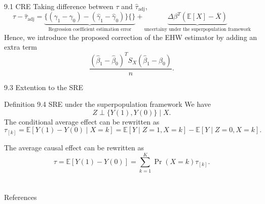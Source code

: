 \documentclass[aspectratio=169, 12pt]{beamer}
\begin{document}
\begin{frame}{9.1 CRE}
  Taking difference between $\tau$ and $\hat{\tau}_{\text{adj}}$,
  \[
  \tau - \hat{\tau}_{\text{adj}} = \underbrace{\{(\gamma_1-\gamma_0)-(\hat{\gamma}_1-\hat{\gamma}_0)\}\{\}}_{\text{Regression coefficient estimation error}} + \underbrace{\Delta \beta^T(\mathbb{E}[X]-\overline{X})}_{\text{uncertainy under the superpopulation framework}}
  \]
  Hence, we introduce the proposed correction of the EHW estimator by adding an extra term
  \[
  \frac{(\hat{\beta}_1-\hat{\beta}_0)^T S_X(\hat{\beta}_1-\hat{\beta}_0)}{n}.
  \]
\end{frame}

\begin{frame}{9.3 Extention to the SRE}
  \begin{keybox}{Definition 9.4 SRE under the superpopulation framework}
    We have
    \[
    Z\perp \{Y(1),Y(0)\}\mid X.
    \]
    The conditional average effect can be rewritten as
    \[
    \tau_{[k]}=\mathbb{E}[Y(1)-Y(0)\mid X=k] = \mathbb{E}[Y\mid Z=1, X=k]-\mathbb{E}[Y\mid Z=0, X=k].
    \]
  \end{keybox}
  The average causal effect can be rewritten as
  \[
  \tau = \mathbb{E}[Y(1)-Y(0)] = \sum_{k=1}^{K}\Pr (X=k)\tau_{[k]}.
  \]
\end{frame}



\section{}
\begin{frame}{References}
  \beamerdefaultoverlayspecification{}
  \small
  
\end{frame}
\end{document}
